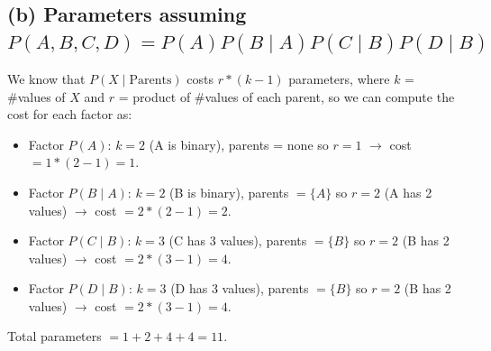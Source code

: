 \documentclass[11pt]{article}
\begin{document}
\subsection*{(b) Parameters assuming $P(A,B,C,D) = P(A)P(B\mid A)P(C\mid B)P(D\mid B)$}
%
We know that $P(X\mid\text{Parents})$ costs $r*(k-1)$ parameters, where $k$ = \#values of $X$ and
$r$ = product of \#values of each parent, so we can compute the cost for each factor as:
\begin{itemize}
\item Factor $P(A)$: $k = 2$ (A is binary), parents = none so $r = 1$ $\to$ cost $= 1*(2-1) = 1$.
\item Factor $P(B\mid A)$: $k = 2$ (B is binary), parents $=\{A\}$ so $r = 2$ (A has 2 values) $\to$ cost $= 2*(2-1) = 2$.
\item Factor $P(C\mid B)$: $k = 3$ (C has 3 values), parents $=\{B\}$ so $r = 2$ (B has 2 values) $\to$ cost $= 2*(3-1) = 4$.
\item Factor $P(D\mid B)$: $k = 3$ (D has 3 values), parents $=\{B\}$ so $r = 2$ (B has 2 values) $\to$ cost $= 2*(3-1) = 4$.
\end{itemize}
Total parameters $= 1 + 2 + 4 + 4 = 11$.
\end{document}
